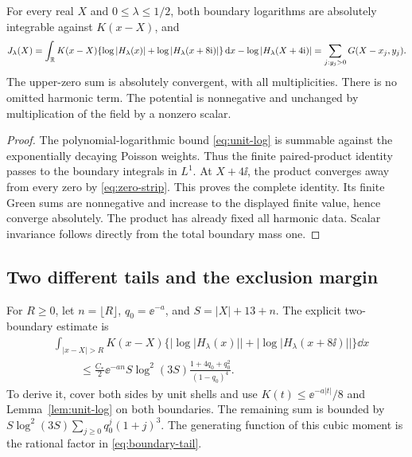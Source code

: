 \begin{theorem}\label{thm:green}
For every real \(X\) and \(0\le\lambda\le1/2\), both boundary
logarithms are absolutely integrable against \(K(x-X)\), and
\begin{equation}\label{eq:green-identity}
 J_\lambda(X)=
 \int_\mathbb R K(x-X)\{\log|H_\lambda(x)|+\log|H_\lambda(x+8\mathrm i)|\}\,\mathrm d x
 -\log|H_\lambda(X+4\mathrm i)|
 =\sum_{j:y_j>0}G(X-x_j,y_j).
\end{equation}
The upper-zero sum is absolutely convergent, with all multiplicities.
There is no omitted harmonic term. The potential is nonnegative and
unchanged by multiplication of the field by a nonzero scalar.
\end{theorem}
\begin{proof}
The polynomial-logarithmic bound \eqref{eq:unit-log} is summable
against the exponentially decaying Poisson weights. Thus the finite
paired-product identity passes to the boundary integrals in \(L^1\).
At \(X+4\ii\), the product converges away from every zero by
\eqref{eq:zero-strip}. This proves the complete identity. Its finite
Green sums are nonnegative and increase to the displayed finite
value, hence converge absolutely. The product has already fixed all
harmonic data. Scalar invariance follows directly from the total
boundary mass one.
\end{proof}

\subsection{Two different tails and the exclusion margin}

For \(R\ge0\), let \(n=\lfloor R\rfloor\), \(q_0=\ee^{-a}\), and
\(S=|X|+13+n\). The explicit two-boundary estimate is
\begin{align}\label{eq:boundary-tail}
 &\int_{|x-X|>R}K(x-X)
  \{|\log|H_\lambda(x)||+|\log|H_\lambda(x+8\ii)||\}\dd x
 \nonumber\\
 &\hspace{1cm}\le
 \frac{C_*}{2}\ee^{-an}S\log^2(3S)
 \frac{1+4q_0+q_0^2}{(1-q_0)^4}.
\end{align}
To derive it, cover both sides by unit shells and use
\(K(t)\le\ee^{-a|t|}/8\) and Lemma~\ref{lem:unit-log} on both
boundaries. The remaining sum is bounded by
\(S\log^2(3S)\sum_{j\ge0}q_0^j(1+j)^3\).
The generating function of this cubic moment is the rational factor
in \eqref{eq:boundary-tail}.

